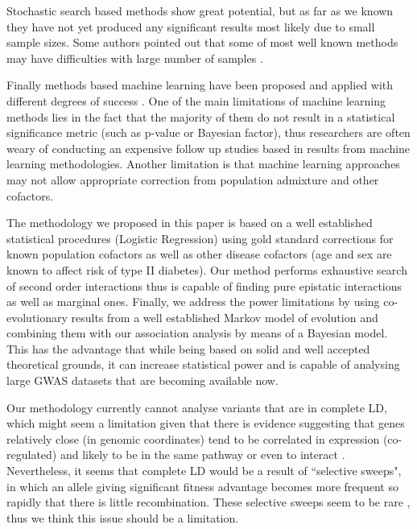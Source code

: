 Stochastic search based methods \cite{zhang2007bayesian} show great potential, but as far as we known they have not yet produced any significant results most likely due to small sample sizes. Some authors pointed out that some of most well known methods may have difficulties with large number of samples \cite{de2013emerging}.

Finally methods based machine learning have been proposed and applied with different degrees of success \cite{koo2013review, cordell2009detecting, li2011detecting}.
One of the main limitations of machine learning methods lies in the fact that the majority of them do not result in a statistical significance metric (such as p-value or Bayesian factor), thus researchers are often weary of conducting an expensive follow up studies based in results from machine learning methodologies.
Another limitation is that machine learning approaches may not allow appropriate correction from population admixture and other cofactors.

The methodology we proposed in this paper is based on a well established statistical procedures (Logistic Regression) using gold standard corrections for known population cofactors as well as other disease cofactors (age and sex are known to affect risk of type II diabetes).
Our method performs exhaustive search of second order interactions thus is capable of finding pure epistatic interactions as well as marginal ones.
Finally, we address the power limitations by using co-evolutionary results from a well established Markov model of evolution and combining them with our association analysis by means of a Bayesian model.
This has the advantage that while being based on solid and well accepted theoretical grounds, it can increase statistical power and is capable of analysing large GWAS datasets that are becoming available now.

Our methodology currently cannot analyse variants that are in complete LD, which might seem a limitation given that there is evidence suggesting that genes relatively close (in genomic coordinates) tend to be correlated in expression (co-regulated) and likely to be in the same pathway or even to interact \cite{petkov2005evidence}.
Nevertheless, it seems that complete LD would be a result of ``selective sweeps", in which an allele giving significant fitness advantage becomes more frequent so rapidly that there is little recombination.
These selective sweeps seem to be rare \cite{hernandez2011classic}, thus we think this issue should be a limitation.

